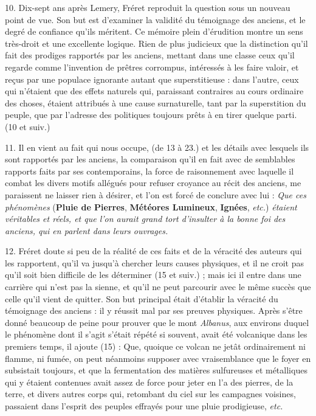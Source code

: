 \documentclass[a4paper, 11pt, oneside, polutonikogreek, french]{article}
\begin{document}
10. Dix-sept ans après Lemery, Fréret reproduit la question sous un nouveau point de vue. Son but est d'examiner la validité du témoignage des anciens, et le degré de confiance qu'ils méritent. Ce mémoire plein d'érudition montre un sens très-droit et une excellente logique. Rien de plus judicieux que la distinction qu'il fait des prodiges rapportés par les anciens, mettant dans une classe ceux qu'il regarde comme l'invention de prêtres corrompus, intéressés à les faire valoir, et reçus par une populace ignorante autant que superstitieuse : dans l'autre, ceux qui n'étaient que des effets naturels qui, paraissant contraires au cours ordinaire des choses, étaient attribués à une cause surnaturelle, tant par la superstition du peuple, que par l'adresse des politiques toujours prêts à en tirer quelque parti. (10 et suiv.)

11. Il en vient au fait qui nous occupe, (de 13 à 23.) et les détails avec lesquels ils sont rapportés par les anciens, la comparaison qu'il en fait avec de semblables rapports faits par ses contemporains, la force de raisonnement avec laquelle il combat les divers motifs allégués pour refuser croyance au récit des anciens, me paraissent ne laisser rien à désirer, et l'on est forcé de conclure avec lui : \og \emph{Que ces phénomènes} (\textbf{Pluie de Pierres}, \textbf{Météores Lumineux}, \textbf{Ignées}, \emph{etc.}) \emph{étaient véritables et réels, et que l'on aurait grand tort d'insulter à la bonne foi des anciens, qui en parlent dans leurs ouvrages.} \fg

12. Fréret doute si peu de la réalité de ces faits et de la véracité des auteurs qui les rapportent, qu'il va jusqu'à chercher leurs causes physiques, et il ne croit pas qu'il soit bien difficile de les déterminer (15 et suiv.) ; mais ici il entre dans une carrière qui n'est pas la sienne, et qu'il ne peut parcourir avec le même succès que celle qu'il vient de quitter. Son but principal était d'établir la véracité du témoignage des anciens : il y réussit mal par ses preuves physiques. Après s'être donné beaucoup de peine pour prouver que le mont \emph{Albanus}, aux environs duquel le phénomène dont il s'agit s'était répété si souvent, avait été volcanique dans les premiers temps, il ajoute (15) : \og Que, quoique ce volcan ne jetât ordinairement ni flamme, ni fumée, on peut néanmoins supposer avec vraisemblance que le foyer en subsistait toujours, et que la fermentation des matières sulfureuses et métalliques qui y étaient contenues avait assez de force pour jeter en l'a des pierres, de la terre, et divers autres corps qui, retombant du ciel sur les campagnes voisines, passaient dans l'esprit des peuples effrayés pour une pluie prodigieuse, \emph{etc.} \fg
\end{document}
